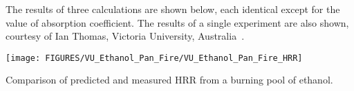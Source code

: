 The results of three calculations are shown below, each identical except for the value of absorption coefficient. The results of a single experiment
are also shown, courtesy of Ian Thomas, Victoria University, Australia~\cite{Thomas:JFPE}.


\begin{center}
\texttt{[image: FIGURES/VU\_Ethanol\_Pan\_Fire/VU\_Ethanol\_Pan\_Fire\_HRR]}
\caption{Comparison of predicted and measured HRR from a burning pool of ethanol.}
\end{center}

